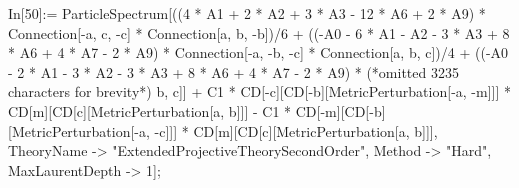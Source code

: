 In[50]:= ParticleSpectrum[((4 * A1 + 2 * A2 + 3 * A3 - 12 * A6 + 2 * A9) * Connection[-a, c, -c] * Connection[a, b, -b])/6 + ((-A0 - 6 * A1 - A2 - 3 * A3 + 8 * A6 + 4 * A7 - 2 * A9) * Connection[-a, -b, -c] * Connection[a, b, c])/4 + ((-A0 - 2 * A1 - 3 * A2 - 3 * A3 + 8 * A6 + 4 * A7 - 2 * A9) * (*omitted 3235 characters for brevity*) b, c]] + C1 * CD[-c][CD[-b][MetricPerturbation[-a, -m]]] * CD[m][CD[c][MetricPerturbation[a, b]]] - C1 * CD[-m][CD[-b][MetricPerturbation[-a, -c]]] * CD[m][CD[c][MetricPerturbation[a, b]]], TheoryName -> "ExtendedProjectiveTheorySecondOrder", Method -> "Hard", MaxLaurentDepth -> 1];